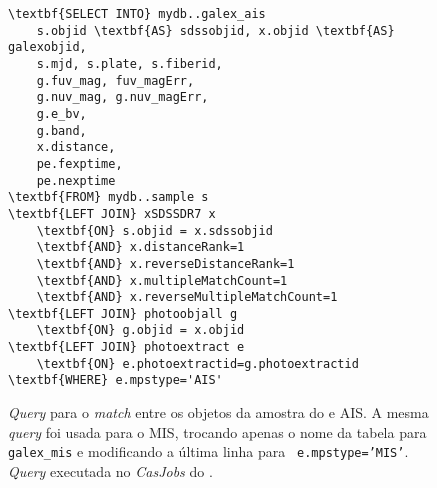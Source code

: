 \begin{figure}
\begin{Verbatim}[frame=single,commandchars=\\\{\}]
\textbf{SELECT INTO} mydb..galex_ais
	s.objid \textbf{AS} sdssobjid, x.objid \textbf{AS} galexobjid,
	s.mjd, s.plate, s.fiberid,
	g.fuv_mag, fuv_magErr,
	g.nuv_mag, g.nuv_magErr,
	g.e_bv,
	g.band,
	x.distance,
	pe.fexptime,
	pe.nexptime
\textbf{FROM} mydb..sample s
\textbf{LEFT JOIN} xSDSSDR7 x
	\textbf{ON} s.objid = x.sdssobjid
	\textbf{AND} x.distanceRank=1
	\textbf{AND} x.reverseDistanceRank=1
	\textbf{AND} x.multipleMatchCount=1
	\textbf{AND} x.reverseMultipleMatchCount=1
\textbf{LEFT JOIN} photoobjall g
	\textbf{ON} g.objid = x.objid
\textbf{LEFT JOIN} photoextract e
	\textbf{ON} e.photoextractid=g.photoextractid
\textbf{WHERE} e.mpstype='AIS'
\end{Verbatim}
	\caption[{\em Match} entre os objetos da amostra do \starlight e \galex.]
	{{\em Query} para o {\em match} entre os objetos da amostra do \starlight e
	\galex AIS. A mesma {\em query} foi usada para o MIS, trocando apenas o nome da
	tabela para {\tt galex\_mis} e modificando a última linha para {\tt
	e.mpstype='MIS'}. {\em Query} executada no {\em CasJobs} do \galex.}
	\label{fig:QueryMatchAIS}
\end{figure}



